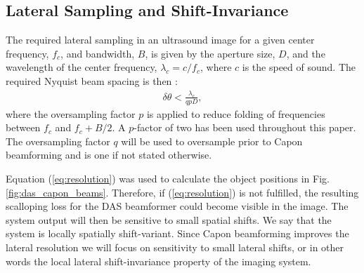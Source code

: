 \documentclass[draftcls]{IEEEtran}
\newcommand{\mat}[1]{\mathbf{#1}}
\renewcommand{\vec}[1]{\mathbf{#1}}
\begin{document}

\subsection{Lateral Sampling and Shift-Invariance}

The required lateral sampling in an ultrasound image for a given center frequency, $f_c$, and bandwidth, $B$, is given by the aperture size, $D$, and the wavelength of the center frequency, $\lambda_c = c/f_c$, where $c$ is the speed of sound. The required Nyquist beam spacing is then \cite{Hergum2007}:
\begin{align}
\delta\theta < \frac{\lambda_c}{qpD}, \label{eq:resolution}
\end{align}
where the oversampling factor $p$ is applied to reduce folding of frequencies between $f_c$ and $f_c + B/2$. A $p$-factor of two has been used throughout this paper. The oversampling factor $q$ will be used to oversample prior to Capon beamforming and is one if not stated otherwise. 

Equation (\ref{eq:resolution}) was used to calculate the object positions in Fig.\,\ref{fig:das_capon_beams}. Therefore, if (\ref{eq:resolution}) is not fulfilled, the resulting scalloping loss for the DAS beamformer could become visible in the image. The system output will then be sensitive to small spatial shifts. We say that the system is locally spatially shift-variant. Since Capon beamforming improves the lateral resolution we will focus on sensitivity to small lateral shifts, or in other words the local lateral shift-invariance property of the imaging system.%
\end{document}
